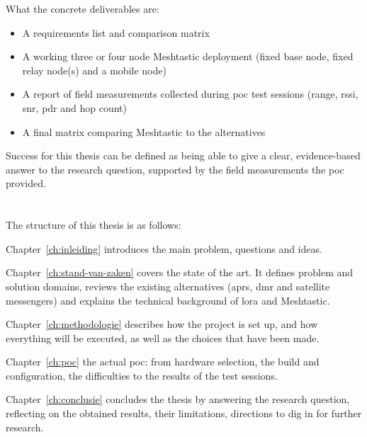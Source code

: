 What the concrete deliverables are:
\begin{itemize}
  \item A requirements list and comparison matrix
  \item A working three or four node Meshtastic deployment (fixed base node, fixed relay node(s) and a mobile node)
  \item A report of field measurements collected during \gls{poc} test sessions (range, \gls{rssi}, \gls{snr}, \gls{pdr} and hop count)
  \item A final matrix comparing Meshtastic to the alternatives
\end{itemize}

Success for this thesis can be defined as being able to give a clear, evidence-based answer to the research question, supported by the field measurements the \gls{poc} provided.

\section{}%
\label{sec:opzet-bachelorproef}

The structure of this thesis is as follows:

Chapter~\ref{ch:inleiding} introduces the main problem, questions and ideas.

Chapter~\ref{ch:stand-van-zaken} covers the state of the art. It defines problem and solution domains, reviews the existing alternatives (\gls{aprs}, \gls{dmr} and satellite messengers) and explains the technical background of \gls{lora} and Meshtastic.

Chapter~\ref{ch:methodologie} describes how the project is set up, and how everything will be executed, as well as the choices that have been made.

Chapter~\ref{ch:poc} the actual \gls{poc}: from hardware selection, the build and configuration, the difficulties to the results of the test sessions.

Chapter~\ref{ch:conclusie} concludes the thesis by answering the research question, reflecting on the obtained results, their limitations, directions to dig in for further research.